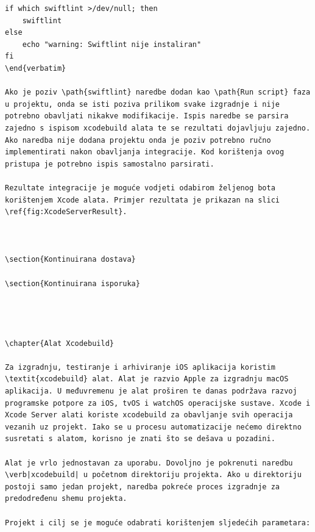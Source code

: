 \documentclass[times, utf8, diplomski, numeric]{fer}
\begin{document}
\begin{appendices}
\begin{lstlisting}[caption=Provjera postojanja i pokretanje Swiftlint alata, label=listing:swiftlint]
if which swiftlint >/dev/null; then
    swiftlint
else
    echo "warning: Swiftlint nije instaliran"
fi
\end{verbatim}

Ako je poziv \path{swiftlint} naredbe dodan kao \path{Run script} faza u projektu, onda se isti poziva prilikom svake izgradnje i nije potrebno obavljati nikakve modifikacije. Ispis naredbe se parsira zajedno s ispisom xcodebuild alata te se rezultati dojavljuju zajedno. Ako naredba nije dodana projektu onda je poziv potrebno ručno implementirati nakon obavljanja integracije. Kod korištenja ovog pristupa je potrebno ispis samostalno parsirati.

Rezultate integracije je moguće vodjeti odabirom željenog bota korištenjem Xcode alata. Primjer rezultata je prikazan na slici \ref{fig:XcodeServerResult}.



\section{Kontinuirana dostava}

\section{Kontinuirana isporuka}




\chapter{Alat Xcodebuild}

Za izgradnju, testiranje i arhiviranje iOS aplikacija koristim \textit{xcodebuild} alat. Alat je razvio Apple za izgradnju macOS aplikacija. U međuvremenu je alat proširen te danas podržava razvoj programske potpore za iOS, tvOS i watchOS operacijske sustave. Xcode i Xcode Server alati koriste xcodebuild za obavljanje svih operacija vezanih uz projekt. Iako se u procesu automatizacije nećemo direktno susretati s alatom, korisno je znati što se dešava u pozadini.

Alat je vrlo jednostavan za uporabu. Dovoljno je pokrenuti naredbu \verb|xcodebuild| u početnom direktoriju projekta. Ako u direktoriju postoji samo jedan projekt, naredba pokreće proces izgradnje za predodređenu shemu projekta.

Projekt i cilj se je moguće odabrati korištenjem sljedećih parametara:


\end{lstlisting}
\end{appendices}
\end{document}
